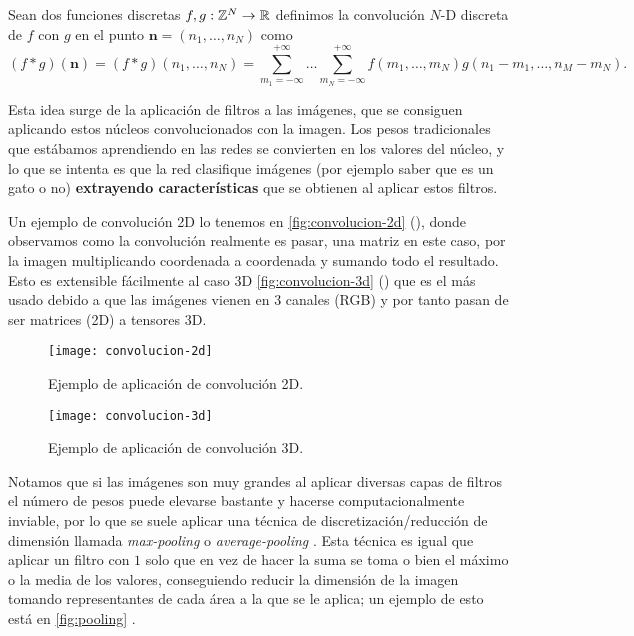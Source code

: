 \begin{definicion}
  Sean dos funciones discretas $f, g : \mathbb{Z}^N \to \mathbb{R}$ definimos la convolución $N$-D discreta de $f$ con $g$ en el punto $\textbf{n} = (n_1, \ldots, n_N)$ como
  $$(f * g)(\textbf{n}) = (f * g)(n_1, \ldots, n_N) = \sum \limits^{+\infty}_{m_1 = -\infty} \ldots \sum^{+\infty}_{m_N = -\infty} f(m_1, \ldots, m_N)g(n_1 - m_1, \ldots, n_M - m_N).$$
  \label{def:convolucion}
\end{definicion}

Esta idea surge de la aplicación de filtros a las imágenes, que se consiguen aplicando estos núcleos convolucionados con la imagen. Los pesos tradicionales que estábamos aprendiendo en las redes se convierten en los valores del núcleo, y lo que se intenta es que la red clasifique imágenes (por ejemplo saber que es un gato o no) \textbf{extrayendo características} que se obtienen al aplicar estos filtros.

Un ejemplo de convolución 2D lo tenemos en \autoref{fig:convolucion-2d} (\cite{pelatrion2020conv}), donde observamos como la convolución realmente es pasar, una matriz en este caso, por la imagen multiplicando coordenada a coordenada y sumando todo el resultado. Esto es extensible fácilmente al caso 3D \autoref{fig:convolucion-3d} (\cite{bansal2018conv}) que es el más usado debido a que las imágenes vienen en 3 canales (RGB) y por tanto pasan de ser matrices (2D) a tensores 3D.

\begin{figure}[htpb]
  \centering
  \texttt{[image: convolucion-2d]}
  \caption{Ejemplo de aplicación de convolución 2D.}
  \label{fig:convolucion-2d}
\end{figure}

\begin{figure}[htpb]
  \centering
  \texttt{[image: convolucion-3d]}
  \caption{Ejemplo de aplicación de convolución 3D.}
  \label{fig:convolucion-3d}
\end{figure}

Notamos que si las imágenes son muy grandes al aplicar diversas capas de filtros el número de pesos puede elevarse bastante y hacerse computacionalmente inviable, por lo que se suele aplicar una técnica de discretización/reducción de dimensión llamada \emph{max-pooling} o \emph{average-pooling }\cite{graham2014fractional}. Esta técnica es igual que aplicar un filtro con $1$ solo que en vez de hacer la suma se toma o bien el máximo o la media de los valores, conseguiendo reducir la dimensión de la imagen tomando representantes de cada área a la que se le aplica; un ejemplo de esto está en \autoref{fig:pooling} \cite{yani2019application}.

